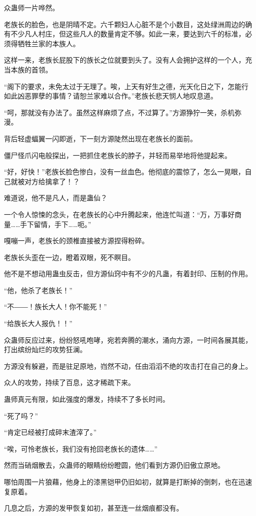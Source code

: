\begin{this_body}
众蛊师一片哗然。

老族长的脸色，也是阴晴不定。六千颗妇人心脏不是个小数目，这处绿洲周边的确有不少凡人村庄，但这些凡人的数量肯定不够。如此一来，要达到六千的标准，必须得牺牲兰家的本族人。

这样一来，老族长屁股下的族长之位就要到头了。没有人会拥护这样的一个人，充当本族的首领。

“阁下的要求，未免太过于无理了。唉，上天有好生之德，光天化日之下，怎能行如此凶恶罪孽的事情？请恕兰家难以合作。”老族长悲天悯人地叹息道。

“呵，那就没有办法了。虽然这样麻烦了点，不过算了。”方源狰狞一笑，杀机弥漫。

背后轻虚蝠翼一闪即逝，下一刻方源陡然出现在老族长的面前。

僵尸怪爪闪电般探出，一把抓住老族长的脖子，并轻而易举地将他提起来。

“好，好快！”老族长脸色惨白，没有一丝血色。他彻底的震惊了，怎么一晃眼，自己就被对方给擒拿了！？

难道说，他不是凡人，而是蛊仙？

一个令人惊悚的念头，在老族长的心中升腾起来，他连忙叫道：“万，万事好商量……手下留情，手下……呃。”

嘎嘣一声，老族长的颈椎直接被方源捏得粉碎。

老族长头歪在一边，瞪着双眼，死不瞑目。

他不是不想动用蛊虫反击，但方源仙窍中有不少的凡蛊，有着封印、压制的作用。

“他，他杀了老族长！”

“不――！族长大人！你不能死！”

“给族长大人报仇！！”

众蛊师反应过来，纷纷怒吼咆哮，宛若奔腾的潮水，涌向方源，一时间各展其能，打出缤纷灿烂的攻势狂澜。

方源没有躲避，而是驻足原地，岿然不动，任由滔滔不绝的攻击打在自己的身上。

众人的攻势，持续了百息，这才稀疏下来。

蛊师真元有限，如此强度的爆发，持续不了多长时间。

“死了吗？”

“肯定已经被打成碎末渣滓了。”

“唉，可怜老族长，我们没有抢回老族长的遗体……”

然而当硝烟散去，众蛊师的眼睛纷纷瞪圆，他们看到方源仍旧傲立原地。

哪怕周围一片狼藉，他身上的漆黑铠甲仍旧如初，就算是打断掉的倒刺，也在迅速复原着。

几息之后，方源的发甲恢复如初，甚至连一丝烟痕都没有。


\end{this_body}
